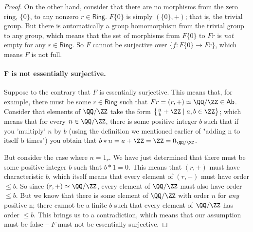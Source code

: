 \documentclass[main.tex]{subfiles}
\begin{document}
\begin{proof}
	On the other hand, consider that there are no morphisms from the zero ring,
	\(\{0\}\), to any nonzero \(r \in \textsf{Ring}\). \(F\{0\}\) is simply
	\((\{0\}, +)\); that is, the trivial group. But there is automatically a
	group homomorphism from the trivial group to any group, which means that the
	set of morphisms from \(F\{0\}\) to \(Fr\) is \textit{not} empty for any \(r
	\in \textsf{Ring}\). So \(F\) cannot be surjective over \(\{f : F\{0\} \to
	Fr\}\), which means \(F\) is not full.

	\paragraph{F is not essentially surjective.}

	Suppose to the contrary that \(F\) is essentially surjective. This means
	that, for example, there must be some \(r \in \textsf{Ring}\) such that \(Fr
	= (r, +) \simeq \QQ/\ZZ \in \textsf{Ab}\). Consider that elements of
	\(\QQ/\ZZ\) take the form \(\left\{\frac{a}{b} + \ZZ \mid a, b \in
	\ZZ\right\}\); which means that for every \(n \in \QQ/\ZZ\), there is some
	positive integer \(b\) such that if you 'multiply' \(n\) by \(b\) (using the
	definition we mentioned earlier of "adding n to itself b times") you obtain
	that \(b*n = a + \ZZ = \ZZ = 0_{\QQ/\ZZ}\).

	But consider the case where \(n = 1_r\). We have just determined that there
	must be some positive integer \(b\) such that \(b*1 = 0\). This means that
	\((r, +)\) must have characteristic \(b\), which itself means that every
	element of \((r, +)\) must have order \(\leq b\). So since \((r, +) \simeq
	\QQ/\ZZ\), every element of \(\QQ/\ZZ\) must also have order \(\leq b\). But
	we know that there is some element of \(\QQ/\ZZ\) with order \(n\) for
	\textit{any} positive n; there cannot be a finite \(b\) such that every
	element of \(\QQ/\ZZ\) has order \(\leq b\). This brings us to a
	contradiction, which means that our assumption must be false -- \(F\) must
	not be essentially surjective.
\end{proof}
\end{document}
